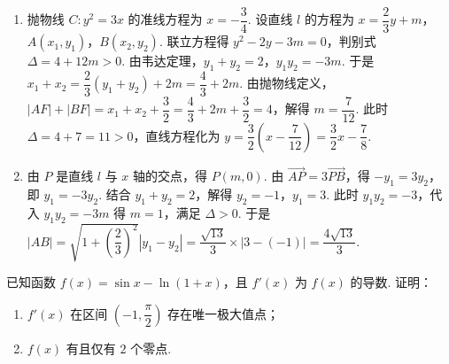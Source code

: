 \begin{solution}
\begin{enumerate}
\item 抛物线 \(C:y^2=3x\) 的准线方程为 \(x=-\dfrac34\). 设直线 \(l\) 的方程为 \(x=\dfrac23y+m\)，\(A(x_1,y_1)\)，\(B(x_2,y_2)\). 联立方程得 \(y^2-2y-3m=0\)，判别式 \(\Delta=4+12m>0\). 由韦达定理，\(y_1+y_2=2\)，\(y_1y_2=-3m\). 于是 \(x_1+x_2=\dfrac23(y_1+y_2)+2m=\dfrac43+2m\). 由抛物线定义，\(|AF|+|BF|=x_1+x_2+\dfrac32=\dfrac43+2m+\dfrac32=4\)，解得 \(m=\dfrac{7}{12}\). 此时 \(\Delta=4+7=11>0\)，直线方程化为 \(y=\dfrac32\left(x-\dfrac{7}{12}\right)=\dfrac32x-\dfrac78\).
\item 由 \(P\) 是直线 \(l\) 与 \(x\) 轴的交点，得 \(P(m,0)\). 由 \(\overrightarrow{AP}=3\overrightarrow{PB}\)，得 \(-y_1=3y_2\)，即 \(y_1=-3y_2\). 结合 \(y_1+y_2=2\)，解得 \(y_2=-1\)，\(y_1=3\). 此时 \(y_1y_2=-3\)，代入 \(y_1y_2=-3m\) 得 \(m=1\)，满足 \(\Delta>0\). 于是 \(|AB|=\sqrt{1+\left(\dfrac23\right)^2}|y_1-y_2|=\dfrac{\sqrt{13}}{3}\times|3-(-1)|=\dfrac{4\sqrt{13}}{3}\).
\end{enumerate}
\end{solution}

\begin{problem}
已知函数 \(f(x)=\sin x-\ln(1+x)\)，且 \(f'(x)\) 为 \(f(x)\) 的导数. 证明：

\begin{enumerate}
\item \(f'(x)\) 在区间 \(\left(-1,\dfrac{\pi}{2}\right)\) 存在唯一极大值点；

\item \(f(x)\) 有且仅有 \(2\) 个零点.
\end{enumerate}
\end{problem}

